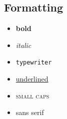 \subsection{Formatting}
\begin{itemize}
    \item \textbf{bold}
    \item \textit{italic}
    \item \texttt{typewriter}
    \item \underline{underlined}
    \item \textsc{small caps}
    \item \textsf{sans serif}
\end{itemize}
